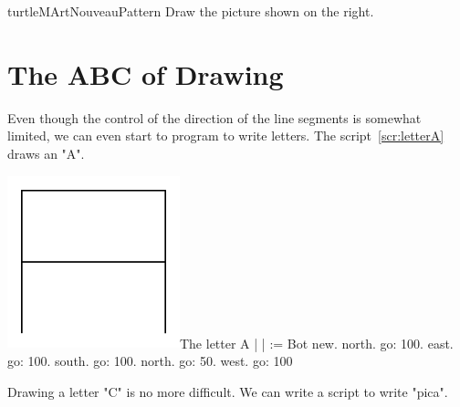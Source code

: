 \begin{exofigwithtitle}{turtleMArtNouveau}{Pattern} \label{exo:artnouveau}
Draw the picture shown on the right.
\end{exofigwithtitle}



\section{The ABC of Drawing}\label{sec:abcDraw} 
Even though the control of the direction of the line segments is
somewhat limited, we can even start to program \caro to
write letters. The script~\ref{scr:letterA} draws an "A".

\begin{scriptfigwithsize}[0.4]{\includegraphics[width=5cm]{turtleMLetterA}}{The letter A}\label{scr:letterA}
| \caro |
\caro := Bot new.
\caro north.
\caro go: 100.
\caro east.
\caro go: 100.
\caro south.
\caro go: 100.
\caro north.
\caro go: 50.
\caro west.
\caro go: 100
\end{scriptfigwithsize}


Drawing a letter "C" is no more difficult. We can 
write a script to write "pica". 




